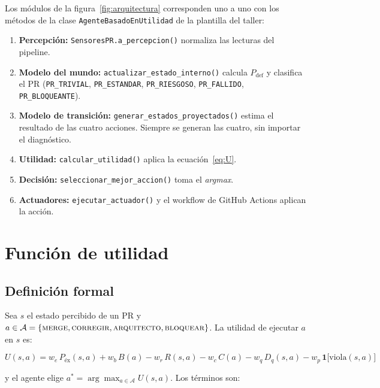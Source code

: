 \documentclass[11pt,a4paper]{article}
\newcommand{\Pdef}{P_{\text{def}}}
\begin{document}
Los módulos de la figura~\ref{fig:arquitectura} corresponden uno a uno con los métodos de la clase
\texttt{AgenteBasadoEnUtilidad} de la plantilla del taller:

\begin{enumerate}[leftmargin=*]
\item \textbf{Percepción:} \texttt{SensoresPR.a\_percepcion()} normaliza las lecturas del pipeline.
\item \textbf{Modelo del mundo:} \texttt{actualizar\_estado\_interno()} calcula $\Pdef$ y clasifica el PR
      (\texttt{PR\_TRIVIAL}, \texttt{PR\_ESTANDAR}, \texttt{PR\_RIESGOSO}, \texttt{PR\_FALLIDO},
      \texttt{PR\_BLOQUEANTE}).
\item \textbf{Modelo de transición:} \texttt{generar\_estados\_proyectados()} estima el resultado de las
      cuatro acciones. Siempre se generan las cuatro, sin importar el diagnóstico.
\item \textbf{Utilidad:} \texttt{calcular\_utilidad()} aplica la ecuación~\eqref{eq:U}.
\item \textbf{Decisión:} \texttt{seleccionar\_mejor\_accion()} toma el \textit{argmax}.
\item \textbf{Actuadores:} \texttt{ejecutar\_actuador()} y el workflow de GitHub Actions aplican la acción.
\end{enumerate}

\section{Función de utilidad}

\subsection{Definición formal}

Sea $s$ el estado percibido de un PR y $a \in \mathcal{A} = \{\textsc{merge}, \textsc{corregir},
\textsc{arquitecto}, \textsc{bloquear}\}$. La utilidad de ejecutar $a$ en $s$ es:

\begin{equation}
\label{eq:U}
U(s,a) = w_e\,P_{\text{éx}}(s,a) + w_b\,B(a) - w_r\,R(s,a) - w_c\,C(a) - w_q\,D_q(s,a) - w_p\,\mathbf{1}\big[\text{viola}(s,a)\big]
\end{equation}

\noindent y el agente elige $a^* = \arg\max_{a \in \mathcal{A}} U(s,a)$. Los términos son:
\end{document}
